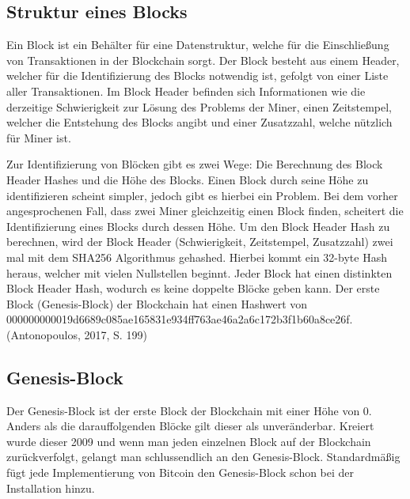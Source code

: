 \subsection{Struktur eines Blocks}
Ein Block ist ein Behälter für eine Datenstruktur, welche für die Einschließung von Transaktionen in der Blockchain sorgt. Der
Block besteht aus einem Header, welcher für die Identifizierung des Blocks notwendig ist, gefolgt von einer Liste aller 
Transaktionen. Im Block Header befinden sich Informationen wie die derzeitige Schwierigkeit zur Lösung des Problems der Miner,
einen Zeitstempel, welcher die Entstehung des Blocks angibt und einer Zusatzzahl, welche nützlich für Miner ist.

Zur Identifizierung von Blöcken gibt es zwei Wege: Die Berechnung des Block Header Hashes und die Höhe des Blocks. Einen Block 
durch seine Höhe zu identifizieren scheint simpler, jedoch gibt es hierbei ein Problem. Bei dem vorher angesprochenen Fall,
dass zwei Miner gleichzeitig einen Block finden, scheitert die Identifizierung eines Blocks durch dessen Höhe. Um den Block
Header Hash zu berechnen, wird der Block Header (Schwierigkeit, Zeitstempel, Zusatzzahl) zwei mal mit dem SHA256 Algorithmus 
gehashed. Hierbei kommt ein 32-byte Hash heraus, welcher mit vielen Nullstellen beginnt. Jeder Block hat einen distinkten Block
Header Hash, wodurch es keine doppelte Blöcke geben kann. Der erste Block (Genesis-Block) der Blockchain hat einen Hashwert von
000000000019d6689c085ae165831e934ff763ae46a2a6c172b3f1b60a8ce26f. (Antonopoulos, 2017, S. 199)


\subsection{Genesis-Block}
Der Genesis-Block ist der erste Block der Blockchain mit einer Höhe von 0. Anders als die darauffolgenden Blöcke gilt dieser als
unveränderbar. Kreiert wurde dieser 2009 und wenn man jeden einzelnen Block auf der Blockchain zurückverfolgt, gelangt man
schlussendlich an den Genesis-Block. Standardmäßig fügt jede Implementierung von Bitcoin den Genesis-Block schon bei der 
Installation hinzu.